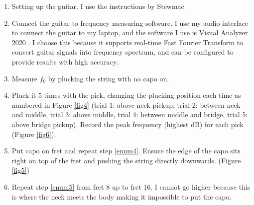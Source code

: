 \begin{enumerate}
    \item Setting up the guitar. I use the instructions by Stewmac \cite{stewmac}
    \item Connect the guitar to frequency measuring software. I use my audio interface to connect the guitar to my laptop, and the software I use is Visual Analyzer 2020 \cite{va20}. I choose this because it supports real-time Fast Fourier Transform to convert guitar signals into frequency spectrum, and can be configured to provide results with high accuracy. 
    \item Measure $f_0$ by plucking the string with no capo on.
    \item Pluck it 5 times with the pick, changing the plucking position each time as numbered in Figure \ref{fig4} (trial 1: above neck pickup, trial 2: between neck and middle, trial 3: above middle, trial 4: between middle and bridge, trial 5: above bridge pickup). Record the peak frequency (highest dB) for each pick (Figure \ref{fig6}). \label{enum4}
    \item Put capo on  fret and repeat step \ref{enum4}. Ensure the edge of the capo sits right on top of the fret and pushing the string directly downwards. (Figure \ref{fig5})\label{enum5}
    \item Repeat step \ref{enum5} from fret 8 up to fret 16. I cannot go higher because this is where the neck meets the body making it impossible to put the capo.
\end{enumerate}